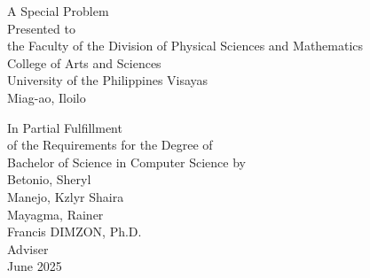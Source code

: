 \begin{titlepage}
\centering


\vspace{0.75cm}
A Special Problem\\
Presented to\\
the Faculty of the Division of Physical Sciences and Mathematics\\
College of Arts and Sciences\\
University of the Philippines Visayas\\
Miag-ao, Iloilo

\vspace{0.8cm}
In Partial Fulfillment\\
of the Requirements for the Degree of\\
Bachelor of Science in Computer Science
\vspace{1.1cm}
by\\

Betonio, Sheryl  \\
Manejo, Kzlyr Shaira  \\
Mayagma, Rainer  \\

\vspace{0.8cm}
Francis DIMZON, Ph.D. \\
Adviser\\


\vspace{0.8cm}
June 2025
\end{titlepage}
